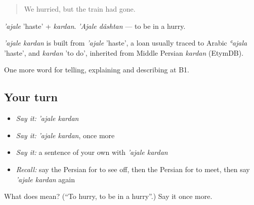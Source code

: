 \begin{quote}
We hurried, but the train had gone.
\end{quote}

\emph{'ajale} 'haste' + \emph{kardan}. \emph{'Ajale dâshtan} — to be in a hurry.

\begin{cousinweb}
\emph{'ajale kardan} is built from \emph{'ajale} 'haste', a loan usually traced to Arabic \emph{ʿajala} 'haste', and \emph{kardan} 'to do', inherited from Middle Persian \emph{kardan} (EtymDB).
\end{cousinweb}

\begin{grammarlens}[title={What you've built}]
One more word for telling, explaining and describing at B1.
\end{grammarlens}

\subsection*{Your turn}
\begin{itemize}
\raggedright
  \item \emph{Say it:} \emph{'ajale kardan}
  \item \emph{Say it:} \emph{'ajale kardan}, once more
  \item \emph{Say it:} a sentence of your own with \emph{'ajale kardan}
  \item \emph{Recall:} say the Persian for to see off, then the Persian for to meet, then say \emph{'ajale kardan} again
\end{itemize}

\begin{tcolorbox}[breakable,colback=teal!4,colframe=teal!35!black,title={Before you move on}]
What does   mean? (\textquotedblleft{}To hurry, to be in a hurry\textquotedblright{}.) Say it once more.
\end{tcolorbox}
